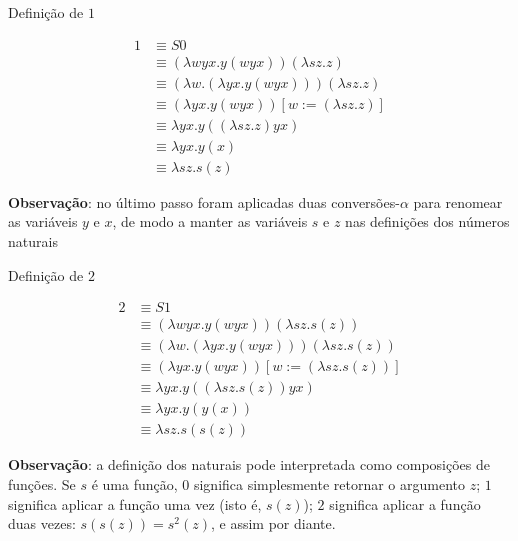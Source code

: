 \begin{frame}[fragile]{Definição de $1$}

    \begin{align*}
        1 &\equiv S0 \\
          &\equiv (\lambda wyx.y(wyx))(\lambda sz.z) \\
          &\equiv (\lambda w.(\lambda yx.y(wyx)))(\lambda sz.z) \\
          &\equiv (\lambda yx.y(wyx))[w:=(\lambda sz.z)] \\
          &\equiv \lambda yx.y((\lambda sz.z)yx) \\
          &\equiv \lambda yx.y(x) \\
          &\equiv \lambda sz.s(z)
    \end{align*}

    \vspace{0.1in}

    \textbf{Observação}: no último passo foram aplicadas duas conversões-$\alpha$ para renomear
        as variáveis $y$ e $x$, de modo a manter as variáveis $s$ e $z$ nas definições dos
        números naturais
\end{frame}

\begin{frame}[fragile]{Definição de $2$}

    \begin{align*}
        2 &\equiv S1 \\
          &\equiv (\lambda wyx.y(wyx))(\lambda sz.s(z)) \\
          &\equiv (\lambda w.(\lambda yx.y(wyx)))(\lambda sz.s(z)) \\
          &\equiv (\lambda yx.y(wyx))[w:=(\lambda sz.s(z))] \\
          &\equiv \lambda yx.y((\lambda sz.s(z))yx) \\
          &\equiv \lambda yx.y(y(x)) \\
          &\equiv \lambda sz.s(s(z))
    \end{align*}

    \vspace{0.1in}

    \textbf{Observação}: a definição dos naturais pode interpretada como composições de funções.
        Se $s$ é uma função, $0$ significa simplesmente retornar o argumento $z$; $1$ 
        significa aplicar a função uma vez (isto é, $s(z)$); $2$ significa aplicar a função duas vezes:
        $s(s(z)) = s^2(z)$, e assim por diante. 
\end{frame}
